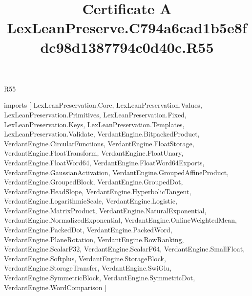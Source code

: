 \begin{lexlean}{R55}
\title{Certificate A LexLeanPreserve.C794a6cad1b5e8fdc98d1387794c0d40c.R55}
\begin{coremodule}
imports [
  LexLeanPreservation.Core,
  LexLeanPreservation.Values,
  LexLeanPreservation.Primitives,
  LexLeanPreservation.Fixed,
  LexLeanPreservation.Keys,
  LexLeanPreservation.Templates,
  LexLeanPreservation.Validate,
  VerdantEngine.BitpackedProduct,
  VerdantEngine.CircularFunctions,
  VerdantEngine.FloatStorage,
  VerdantEngine.FloatTransform,
  VerdantEngine.FloatUnary,
  VerdantEngine.FloatWord64,
  VerdantEngine.FloatWord64Exports,
  VerdantEngine.GaussianActivation,
  VerdantEngine.GroupedAffineProduct,
  VerdantEngine.GroupedBlock,
  VerdantEngine.GroupedDot,
  VerdantEngine.HeadSlope,
  VerdantEngine.HyperbolicTangent,
  VerdantEngine.LogarithmicScale,
  VerdantEngine.Logistic,
  VerdantEngine.MatrixProduct,
  VerdantEngine.NaturalExponential,
  VerdantEngine.NormalizedExponential,
  VerdantEngine.OnlineWeightedMean,
  VerdantEngine.PackedDot,
  VerdantEngine.PackedWord,
  VerdantEngine.PlaneRotation,
  VerdantEngine.RowRanking,
  VerdantEngine.ScalarF32,
  VerdantEngine.ScalarF64,
  VerdantEngine.SmallFloat,
  VerdantEngine.Softplus,
  VerdantEngine.StorageBlock,
  VerdantEngine.StorageTransfer,
  VerdantEngine.SwiGlu,
  VerdantEngine.SymmetricBlock,
  VerdantEngine.SymmetricDot,
  VerdantEngine.WordComparison
]


\end{coremodule}
\end{lexlean}
